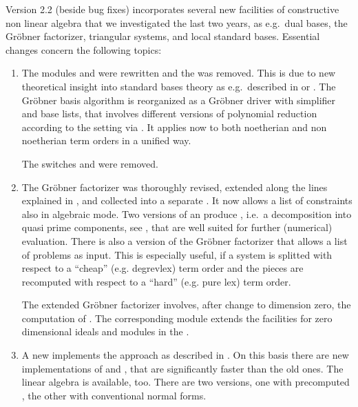 Version 2.2 (beside bug fixes) incorporates several new facilities of
constructive non linear algebra that we investigated the last two
years, as e.g.\ dual bases, the Gr\"obner factorizer, triangular systems, and
local standard bases. Essential changes concern the following topics:
\begin{enumerate}
\item The  modules  and  were rewritten and
the  was removed. This is
due to new theoretical insight into standard bases theory as
e.g.\ described in \cite{Graebe:94} or \cite{Graebe:95a}. The Gr\"obner basis algorithm
is reorganized as a Gr\"obner driver with simplifier and base lists, that
involves different versions of polynomial reduction according to the
setting via . It applies now to
both noetherian and non noetherian term orders in a unified way.

The switches  and   were removed.

\item The Gr\"obner factorizer was thoroughly revised, extended along the
lines explained in \cite{Graebe:94a}, and collected into a separate
. It now allows a list of constraints also in
algebraic mode. Two versions of an 
produce ,
i.e.\ a decomposition into quasi prime components, see \cite{Graebe:95b},
that are well suited for further (numerical) evaluation. There is also
a version of the Gr\"obner factorizer that allows a list of problems as
input. This is especially useful, if a system is splitted with respect
to a ``cheap'' (e.g. degrevlex) term order and the pieces are
recomputed with respect to a ``hard'' (e.g. pure lex) term order.

The extended Gr\"obner factorizer involves, after change to dimension zero,
the computation of . The corresponding module
 extends the facilities for zero dimensional ideals and
modules in the .

\item A new  implements the  approach
as described in \cite{Marinari:91}. On this basis there are new
implementations of  and , that
are significantly faster than the old ones. The linear algebra
 \cite{Faugere:93} is available, too. There are
two versions, one with precomputed , the other with
conventional normal forms.


\end{enumerate}
